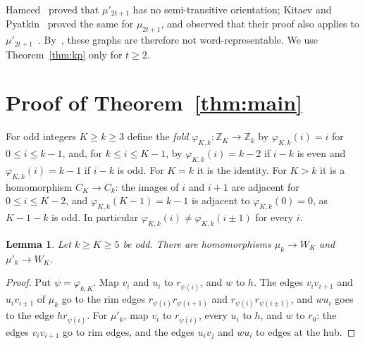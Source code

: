 \documentclass[11pt]{article}
\newtheorem{lemma}{Lemma}[section]
\theoremstyle{remark}
\newcommand{\Z}{\mathbb Z}
\begin{document}
Hameed~\cite{hameed} proved that $\mu'_{2t+1}$ has no semi-transitive
orientation; Kitaev and Pyatkin~\cite[Theorem~4]{kp} proved the same for
$\mu_{2t+1}$, and observed that their proof also applies to
$\mu'_{2t+1}$~\cite[Remark~5]{kp}. By~\cite{hkp}, these graphs are
therefore not word-representable. We use Theorem~\ref{thm:kp} only for
$t\ge2$.

\section{Proof of Theorem~\ref{thm:main}}\label{sec:proof}
For odd integers $K\ge k\ge3$ define the \emph{fold}
$\varphi_{K,k}\colon\Z_K\to\Z_k$ by $\varphi_{K,k}(i)=i$ for $0\le i\le k-1$,
and, for $k\le i\le K-1$, by $\varphi_{K,k}(i)=k-2$ if $i-k$ is even and
$\varphi_{K,k}(i)=k-1$ if $i-k$ is odd. For $K=k$ it is the identity. For
$K>k$ it is a homomorphism $C_K\to C_k$: the images of $i$ and $i+1$ are
adjacent for $0\le i\le K-2$, and $\varphi_{K,k}(K-1)=k-1$ is adjacent to
$\varphi_{K,k}(0)=0$, as $K-1-k$ is odd. In particular
$\varphi_{K,k}(i)\ne\varphi_{K,k}(i\pm1)$ for every $i$.

\begin{lemma}\label{lem:hom}
Let $k\ge K\ge5$ be odd. There are homomorphisms $\mu_k\to W_K$ and
$\mu'_k\to W_K$.
\end{lemma}
\begin{proof}
Put $\psi=\varphi_{k,K}$. Map $v_i$ and $u_i$ to $r_{\psi(i)}$, and $w$ to
$h$. The edges $v_iv_{i+1}$ and $u_iv_{i\pm1}$ of $\mu_k$ go to the rim edges
$r_{\psi(i)}r_{\psi(i+1)}$ and $r_{\psi(i)}r_{\psi(i\pm1)}$, and $wu_i$ goes to
the edge $hr_{\psi(i)}$. For $\mu'_k$, map $v_i$ to $r_{\psi(i)}$, every $u_i$
to $h$, and $w$ to $r_0$: the edges $v_iv_{i+1}$ go to rim edges, and the
edges $u_iv_j$ and $wu_i$ to edges at the hub.
\end{proof}
\end{document}
